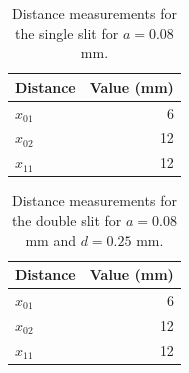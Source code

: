 %
\begin{table}[ht!]
	\centering
	\begin{tabular}{|l|r|} \hline
		Distance & Value (mm) \\
		\hline
		$x_{01}$ & 6 \\
		$x_{02}$ & 12 \\
		$x_{11}$ & 12 \\
		\hline
	\end{tabular}
	\caption{Distance measurements for the single slit for $a = 0.08$ mm.}
	\label{table.10.part1.single}
\end{table}
%
\begin{table}[ht!]
	\centering
	\begin{tabular}{|l|r|} \hline
		Distance & Value (mm) \\
		\hline
		$x_{01}$ & 6 \\
		$x_{02}$ & 12 \\
		$x_{11}$ & 12 \\
		\hline
	\end{tabular}
	\caption{Distance measurements for the double slit for $a = 0.08$ mm and $d = 0.25$ mm.}
	\label{table.10.part1.double}
\end{table}
%
\newpage
